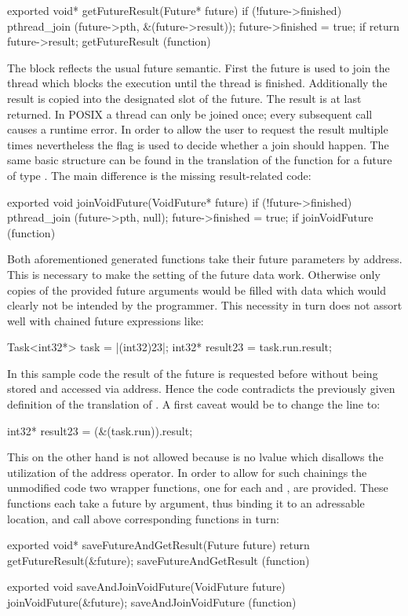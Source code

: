 \begin{ccode}
exported void* getFutureResult(Future* future) { 
  if (!future->finished) { 
    pthread_join (future->pth, &(future->result)); 
    future->finished = true; 
  } if 
  return future->result; 
} getFutureResult (function)
\end{ccode}
The  block reflects the usual future semantic. First the future is used to join the thread which blocks the execution until the thread is finished. Additionally the result is copied into the designated slot of the future. The result is at last returned. In POSIX a thread can only be joined once; every subsequent call causes a runtime error. In order to allow the user to request the result multiple times nevertheless the  flag is used to decide whether a join should happen. The same basic structure can be found in the translation of the  function for a future of type . The main difference is the missing result-related code:
\begin{ccode}
exported void joinVoidFuture(VoidFuture* future) { 
  if (!future->finished) { 
    pthread_join (future->pth, null); 
    future->finished = true; 
  } if 
} joinVoidFuture (function)
\end{ccode}
Both aforementioned generated functions take their future parameters by address. This is necessary to make the setting of the future data work. Otherwise only copies of the provided future arguments would be filled with data which would clearly not be intended by the programmer. This necessity in turn does not assort well with chained future expressions like:

\begin{ccode}
Task<int32*> task = |(int32)23|;
int32* result23 = task.run.result;
\end{ccode}

In this sample code the result of the future is requested before without being stored and accessed via address. Hence the code contradicts the previously given definition of the translation of . A first caveat would be to change the line to:

\begin{ccode}
int32* result23 = (&(task.run)).result;
\end{ccode}

This on the other hand is not allowed because  is no lvalue\cite[pp.~147-148]{CPrimerPlus} which disallows the utilization of the address operator. In order to allow for such chainings the unmodified code two wrapper functions, one for each  and , are provided. These functions each take a future by argument, thus binding it to an adressable location, and call above corresponding functions in turn:
\begin{ccode}
exported void* saveFutureAndGetResult(Future future) { 
  return getFutureResult(&future); 
} saveFutureAndGetResult (function)

exported void saveAndJoinVoidFuture(VoidFuture future) { 
  joinVoidFuture(&future); 
} saveAndJoinVoidFuture (function)
\end{ccode}


